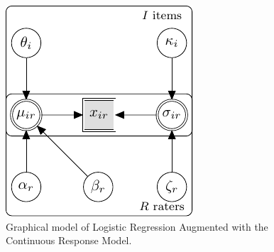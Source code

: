 \documentclass[a4paper,11pt]{article}
\begin{document}
\begin{figure}[!ht]
		\centering
		\includegraphics[width=\textwidth, page=4]{graphicalmodels.pdf}
	\caption{Graphical model of Logistic Regression Augmented with the Continuous Response Model.}
	\label{model:Logistic_CRM}
\end{figure}
\end{document}
